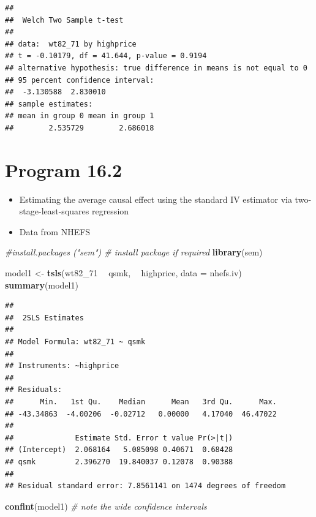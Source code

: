 \documentclass[
  10pt,
]{book}
\newenvironment{Shaded}{\begin{snugshade}}{\end{snugshade}}
\newcommand{\CommentTok}[1]{\textcolor[rgb]{0.56,0.35,0.01}{\textit{#1}}}
\newcommand{\DataTypeTok}[1]{\textcolor[rgb]{0.13,0.29,0.53}{#1}}
\newcommand{\DecValTok}[1]{\textcolor[rgb]{0.00,0.00,0.81}{#1}}
\newcommand{\KeywordTok}[1]{\textcolor[rgb]{0.13,0.29,0.53}{\textbf{#1}}}
\newcommand{\NormalTok}[1]{#1}
\newcommand{\OperatorTok}[1]{\textcolor[rgb]{0.81,0.36,0.00}{\textbf{#1}}}
\newcommand{\StringTok}[1]{\textcolor[rgb]{0.31,0.60,0.02}{#1}}
\providecommand{\tightlist}{%
  \setlength{\itemsep}{0pt}\setlength{\parskip}{0pt}}
\begin{document}
\begin{verbatim}
## 
## 	Welch Two Sample t-test
## 
## data:  wt82_71 by highprice
## t = -0.10179, df = 41.644, p-value = 0.9194
## alternative hypothesis: true difference in means is not equal to 0
## 95 percent confidence interval:
##  -3.130588  2.830010
## sample estimates:
## mean in group 0 mean in group 1 
##        2.535729        2.686018
\end{verbatim}

\hypertarget{program-16.2}{%
\section{Program 16.2}\label{program-16.2}}

\begin{itemize}
\tightlist
\item
  Estimating the average causal effect using the standard IV estimator via two-stage-least-squares regression
\item
  Data from NHEFS
\end{itemize}

\begin{Shaded}
\begin{Highlighting}[]
\CommentTok{#install.packages ("sem") # install package if required}
\KeywordTok{library}\NormalTok{(sem) }

\NormalTok{model1 <-}\StringTok{ }\KeywordTok{tsls}\NormalTok{(wt82_}\DecValTok{71} \OperatorTok{~}\StringTok{ }\NormalTok{qsmk, }\OperatorTok{~}\StringTok{ }\NormalTok{highprice, }\DataTypeTok{data =}\NormalTok{ nhefs.iv)}
\KeywordTok{summary}\NormalTok{(model1)}
\end{Highlighting}
\end{Shaded}

\begin{verbatim}
## 
##  2SLS Estimates
## 
## Model Formula: wt82_71 ~ qsmk
## 
## Instruments: ~highprice
## 
## Residuals:
##      Min.   1st Qu.    Median      Mean   3rd Qu.      Max. 
## -43.34863  -4.00206  -0.02712   0.00000   4.17040  46.47022 
## 
##              Estimate Std. Error t value Pr(>|t|)
## (Intercept)  2.068164   5.085098 0.40671  0.68428
## qsmk         2.396270  19.840037 0.12078  0.90388
## 
## Residual standard error: 7.8561141 on 1474 degrees of freedom
\end{verbatim}

\begin{Shaded}
\begin{Highlighting}[]
\KeywordTok{confint}\NormalTok{(model1)  }\CommentTok{# note the wide confidence intervals}
\end{Highlighting}
\end{Shaded}
\end{document}
